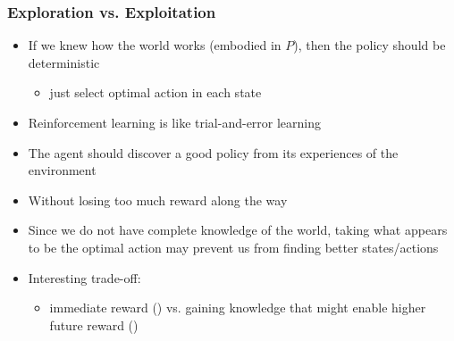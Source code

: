 \documentclass[handout]{beamer}
\begin{document}
\begin{frame}\frametitle{Exploration vs. Exploitation}\small
\begin{itemize}
\item If we knew how the world works (embodied in $P$), then the policy should be deterministic 
\begin{itemize}
\item  just select optimal action in each state
\end{itemize}
\item Reinforcement learning is like trial-and-error learning
\item The agent should discover a good policy from its experiences of the environment
\item Without losing too much reward along the way

\item Since we do not have complete knowledge of the world, taking what appears to be the optimal action may prevent us from finding better states/actions
\item Interesting trade-off: 
\begin{itemize}
\item immediate reward () vs. gaining knowledge that might enable higher future reward ()
\end{itemize}
\end{itemize}
\end{frame}
\end{document}
